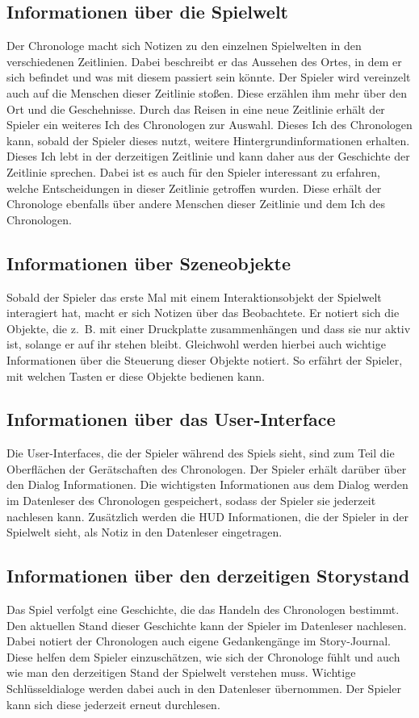 \subsection{Informationen über die Spielwelt}
Der Chronologe macht sich Notizen zu den einzelnen Spielwelten in den verschiedenen Zeitlinien. Dabei beschreibt er das Aussehen des Ortes, in dem er sich befindet und was mit diesem passiert sein könnte. Der Spieler wird vereinzelt auch auf die Menschen dieser Zeitlinie stoßen. Diese erzählen ihm mehr über den Ort und die Geschehnisse. Durch das Reisen in eine neue Zeitlinie erhält der Spieler ein weiteres Ich des Chronologen zur Auswahl. Dieses Ich des Chronologen kann, sobald der Spieler dieses nutzt, weitere Hintergrundinformationen erhalten. Dieses Ich lebt in der derzeitigen Zeitlinie und kann daher aus der Geschichte der Zeitlinie sprechen. 
Dabei ist es auch für den Spieler interessant zu erfahren, welche Entscheidungen in dieser Zeitlinie getroffen wurden. Diese erhält der Chronologe ebenfalls über andere Menschen dieser Zeitlinie und dem Ich des Chronologen.

\subsection{Informationen über Szeneobjekte}
Sobald der Spieler das erste Mal mit einem Interaktionsobjekt der Spielwelt interagiert hat, macht er sich Notizen über das Beobachtete. Er notiert sich die Objekte, die z. B. mit einer Druckplatte zusammenhängen und dass sie nur aktiv ist, solange er auf ihr stehen bleibt. Gleichwohl werden hierbei auch wichtige Informationen über die Steuerung dieser Objekte notiert. So erfährt der Spieler, mit welchen Tasten er diese Objekte bedienen kann.

\subsection{Informationen über das User-Interface}
Die User-Interfaces, die der Spieler während des Spiels sieht, sind zum Teil die Oberflächen der Gerätschaften des Chronologen. Der Spieler erhält darüber über den Dialog Informationen. Die wichtigsten Informationen aus dem Dialog werden im Datenleser des Chronologen gespeichert, sodass der Spieler sie jederzeit nachlesen kann. Zusätzlich werden die \ac{HUD} Informationen, die der Spieler in der Spielwelt sieht, als Notiz in den Datenleser eingetragen. 

\subsection{Informationen über den derzeitigen Storystand}
Das Spiel verfolgt eine Geschichte, die das Handeln des Chronologen bestimmt. Den aktuellen Stand dieser Geschichte kann der Spieler im Datenleser nachlesen. Dabei notiert der Chronologen auch eigene Gedankengänge im Story-Journal. Diese helfen dem Spieler einzuschätzen, wie sich der Chronologe fühlt und auch wie man den derzeitigen Stand der Spielwelt verstehen muss. Wichtige Schlüsseldialoge werden dabei auch in den Datenleser übernommen. Der Spieler kann sich diese jederzeit erneut durchlesen.

